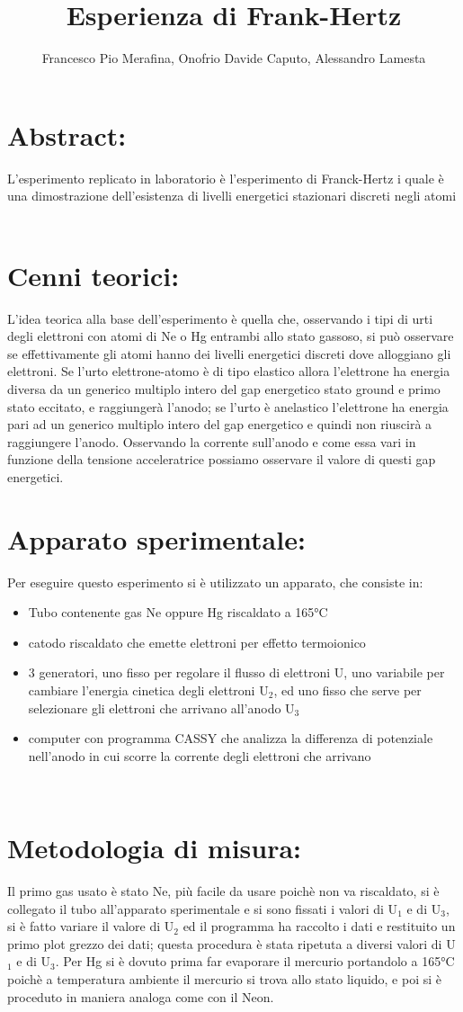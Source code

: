 \documentclass{article}
\title{Esperienza di Frank-Hertz}
\author{Francesco Pio Merafina, Onofrio Davide Caputo, Alessandro Lamesta}
\date{}
\begin{document}
\maketitle
\section{Abstract:}
L’esperimento replicato in laboratorio è l'esperimento di Franck-Hertz i quale è una dimostrazione dell’esistenza di livelli energetici stazionari discreti negli atomi
~
\section{Cenni teorici:}
L'idea teorica alla base dell'esperimento è quella che, osservando i tipi di urti degli elettroni con atomi di Ne o Hg entrambi allo stato gassoso, si può osservare se effettivamente gli atomi hanno dei livelli energetici discreti dove alloggiano gli elettroni. Se l'urto elettrone-atomo è di tipo elastico allora l'elettrone ha energia diversa da un generico multiplo intero del gap energetico stato ground e primo stato eccitato, e raggiungerà l'anodo; se l'urto è anelastico l'elettrone ha energia pari ad un generico multiplo intero del gap energetico e quindi non riuscirà a raggiungere l'anodo. Osservando la corrente sull'anodo e come essa vari in funzione della tensione acceleratrice possiamo osservare il valore di questi gap energetici.
~
\section{Apparato sperimentale:}
Per eseguire questo esperimento si è utilizzato un apparato, che consiste in:
\begin{itemize}
    \item Tubo contenente gas Ne oppure Hg riscaldato a 165°C
    \item catodo riscaldato che emette elettroni per effetto termoionico
    \item 3 generatori, uno fisso per regolare il flusso di elettroni U, uno variabile per cambiare l'energia cinetica degli elettroni U$_{2}$, ed uno fisso che serve per selezionare gli elettroni che arrivano all'anodo U$_{3}$
    \item computer con programma CASSY che analizza la differenza di potenziale nell'anodo in cui scorre la corrente degli elettroni che arrivano
\end{itemize}
~
\section{Metodologia di misura:}
Il primo gas usato è stato Ne, più facile da usare poichè non va riscaldato, si è collegato il tubo all'apparato sperimentale e si sono fissati i valori di U$_{1}$ e di U$_{3}$, si è fatto variare il valore di U$_{2}$ ed il programma ha raccolto i dati e restituito un primo plot grezzo dei dati; questa procedura è stata ripetuta a diversi valori di U$_{1}$ e di U$_{3}$. Per Hg si è dovuto prima far evaporare il mercurio portandolo a 165°C poichè a temperatura ambiente il mercurio si trova allo stato liquido, e poi si è proceduto in maniera analoga come con il Neon.
~
\end{document}

